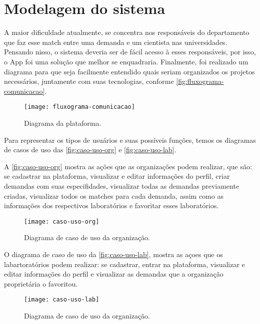 \section{Modelagem do sistema}\label{sec:modelagemSistema}

A maior dificuldade atualmente, se concentra nos responsáveis do departamento que faz esse match entre uma demanda e um cientista nas universidades.
Pensando nisso, o sistema deveria ser de fácil acesso à esses responsáveis, por isso, o App foi uma solução que melhor se enquadraria. 
Finalmente, foi realizado um diagrama para que seja facilmente entendido quais seriam organizados os projetos necessários, juntamente com suas tecnologias, conforme \autoref{fig:fluxograma-comunicacao}.

\begin{figure}[htb]
    \captionsetup{width=0.43\textwidth}
    \caption{Diagrama da plataforma.}
    \label{fig:fluxograma-comunicacao}
    \texttt{[image: fluxograma-comunicacao]}
    \fonte{}
\end{figure}

Para representar os tipos de usuários e suas possíveis funções, temos os diagramas de casos de uso das \autoref{fig:caso-uso-org} e \autoref{fig:caso-uso-lab}. 

A \autoref{fig:caso-uso-org} mostra as ações que as organizações podem realizar, que são: se cadastrar na plataforma, visualizar e editar informações do perfil, criar demandas com suas especifidades, visualizar todas as demandas previamente criadas, visualizar todos os matches para cada demanda, assim como as informações dos respectivos laboratórios e favoritar esses laboratórios.

\begin{figure}[htb]
    \captionsetup{width=0.43\textwidth}
    \caption{Diagrama de caso de uso da organização.}
    \label{fig:caso-uso-org}
    \texttt{[image: caso-uso-org]}
    \fonte{}
\end{figure}

O diagrama de caso de uso da \autoref{fig:caso-uso-lab}, mostra as açoes que os labartoratórios podem realizar: se cadastrar, entrar na plataforma, visualizar e editar informações do perfil e visualizar as demandas que a organização proprietária o favoritou.

\begin{figure}[htb]
    \captionsetup{width=0.43\textwidth}
    \caption{Diagrama de caso de uso da organização.}
    \label{fig:caso-uso-lab}
    \texttt{[image: caso-uso-lab]}
    \fonte{}
\end{figure}

